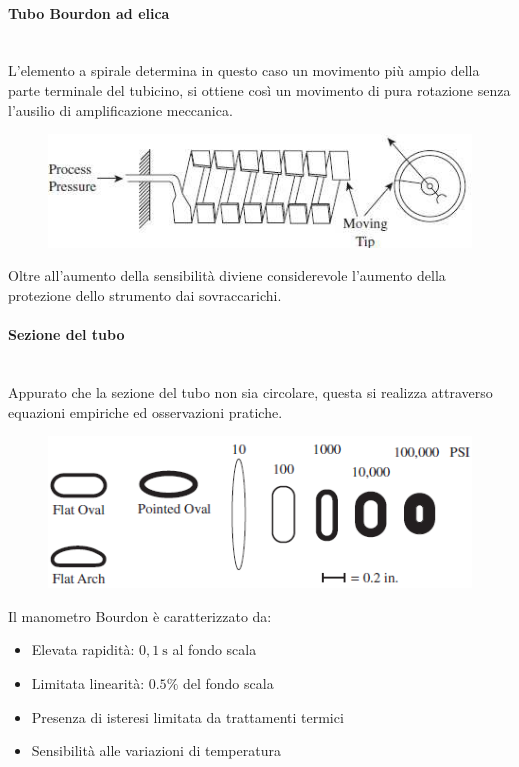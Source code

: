 \documentclass[a4paper, 15pt]{article}
\begin{document}
\begin{adjustwidth}{2in}{}
\paragraph{Tubo Bourdon ad elica} \mbox{} \\
  		L'elemento a spirale determina in questo caso un movimento più ampio della parte terminale del tubicino, si ottiene così un movimento di pura rotazione senza l'ausilio di amplificazione meccanica. 
  		\begin{figure}[H]
  			\centering
  			\includegraphics[width=0.3\linewidth]{immagini/manometro6}
  			\label{fig:manometro6}
  		\end{figure}
  		Oltre all'aumento della sensibilità diviene considerevole l'aumento della protezione dello strumento dai sovraccarichi. \newline 
  		
\paragraph{Sezione del tubo} \mbox{} \\
  		Appurato che la sezione del tubo non sia circolare, questa si realizza attraverso equazioni empiriche ed osservazioni pratiche.
  		\begin{figure}[H]
  			\centering
  			\includegraphics[width=0.3\linewidth]{immagini/manometro7}
  			\label{fig:manometro7}
  		\end{figure}
  		Il manometro Bourdon è caratterizzato da:
  		\begin{itemize}
  			\item Elevata rapidità: $0,1~\text{s}$ al fondo scala
  			\item Limitata linearità: $0.5\%$ del fondo scala
  			\item Presenza di isteresi limitata da trattamenti termici
  			\item Sensibilità alle variazioni di temperatura 
  		\end{itemize}
\newpage  		

\end{adjustwidth}
\end{document}
